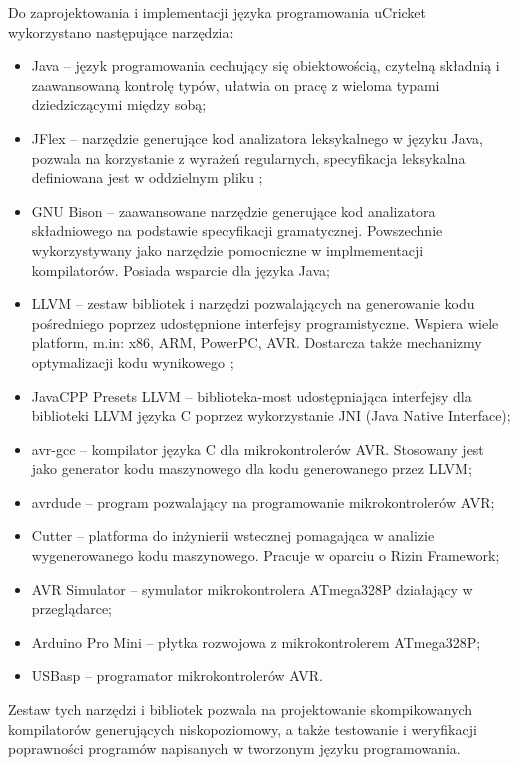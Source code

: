 Do zaprojektowania i implementacji języka programowania uCricket wykorzystano następujące narzędzia:
\begin{itemize}
\item Java -- język programowania cechujący się obiektowością, czytelną składnią i zaawansowaną kontrolę typów, ułatwia on pracę z wieloma typami dziedziczącymi między sobą;
\item JFlex -- narzędzie generujące kod analizatora leksykalnego w języku Java, pozwala na korzystanie z wyrażeń regularnych, specyfikacja leksykalna definiowana jest w oddzielnym pliku \cytowanie;
\item GNU Bison -- zaawansowane narzędzie generujące kod analizatora składniowego na podstawie specyfikacji gramatycznej. Powszechnie wykorzystywany jako narzędzie pomocniczne w implmementacji kompilatorów. Posiada wsparcie dla języka Java;
\item LLVM -- zestaw bibliotek i narzędzi pozwalających na generowanie kodu pośredniego poprzez udostępnione interfejsy programistyczne. Wspiera wiele platform, m.in: x86, ARM, PowerPC, AVR. Dostarcza także mechanizmy optymalizacji kodu wynikowego \cytowanie;
\item JavaCPP Presets LLVM -- biblioteka-most udostępniająca interfejsy dla biblioteki LLVM języka C poprzez wykorzystanie JNI (Java Native Interface);
\item avr-gcc -- kompilator języka C dla mikrokontrolerów AVR. Stosowany jest jako generator kodu maszynowego dla kodu generowanego przez LLVM;
\item avrdude -- program pozwalający na programowanie mikrokontrolerów AVR;
\item Cutter -- platforma do inżynierii wstecznej pomagająca w analizie wygenerowanego kodu maszynowego. Pracuje w oparciu o Rizin Framework;
\item AVR Simulator -- symulator mikrokontrolera ATmega328P działający w przeglądarce;
\item Arduino Pro Mini -- płytka rozwojowa z mikrokontrolerem ATmega328P;
\item USBasp -- programator mikrokontrolerów AVR.
\end{itemize}

Zestaw tych narzędzi i bibliotek pozwala na projektowanie skompikowanych kompilatorów generujących niskopoziomowy, a także testowanie i weryfikacji poprawności programów napisanych w tworzonym języku programowania.

%
